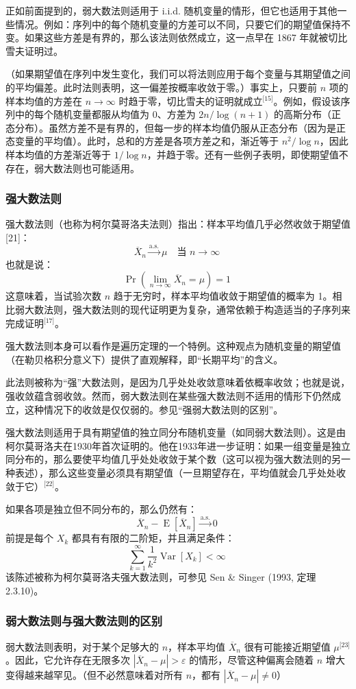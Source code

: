 正如前面提到的，弱大数法则适用于 i.i.d. 随机变量的情形，但它也适用于其他一些情况。例如：序列中的每个随机变量的方差可以不同，只要它们的期望值保持不变。如果这些方差是有界的，那么该法则依然成立，这一点早在 1867 年就被切比雪夫证明过。

（如果期望值在序列中发生变化，我们可以将法则应用于每个变量与其期望值之间的平均偏差。此时法则表明，这一偏差按概率收敛于零。）事实上，只要前 $n$ 项的样本均值的方差在 $n \to \infty$ 时趋于零，切比雪夫的证明就成立\(^\text{[15]}\)。例如，假设该序列中的每个随机变量都服从均值为 0、方差为 $2n/\log(n+1)$ 的高斯分布（正态分布）。虽然方差不是有界的，但每一步的样本均值仍服从正态分布（因为是正态变量的平均值）。此时，总和的方差是各项方差之和，渐近等于 $n^2 / \log n$，因此样本均值的方差渐近等于 $1 / \log n$，并趋于零。还有一些例子表明，即使期望值不存在，弱大数法则也可能适用。
\subsubsection{强大数法则}
强大数法则（也称为柯尔莫哥洛夫法则）指出：样本平均值几乎必然收敛于期望值[21]：
$$
\overline{X}_n \xrightarrow{\text{a.s.}} \mu \quad \text{当 } n \to \infty~
$$
也就是说：
$$
\Pr\left(\lim_{n \to \infty} \overline{X}_n = \mu\right) = 1~
$$
这意味着，当试验次数 $n$ 趋于无穷时，样本平均值收敛于期望值的概率为 1。相比弱大数法则，强大数法则的现代证明更为复杂，通常依赖于构造适当的子序列来完成证明\(^\text{[17]}\)。

强大数法则本身可以看作是遍历定理的一个特例。这种观点为随机变量的期望值（在勒贝格积分意义下）提供了直观解释，即“长期平均”的含义。

此法则被称为“强”大数法则，是因为几乎处处收敛意味着依概率收敛；也就是说，强收敛蕴含弱收敛。然而，弱大数法则在某些强大数法则不适用的情形下仍然成立，这种情况下的收敛是仅仅弱的。参见“强弱大数法则的区别”。

强大数法则适用于具有期望值的独立同分布随机变量（如同弱大数法则）。这是由柯尔莫哥洛夫在1930年首次证明的。他在1933年进一步证明：如果一组变量是独立同分布的，那么要使平均值几乎处处收敛于某个数（这可以视为强大数法则的另一种表述），那么这些变量必须具有期望值（一旦期望存在，平均值就会几乎处处收敛于它）\(^\text{[22]}\)。

如果各项是独立但不同分布的，那么仍然有：
$$
\overline{X}_n - \operatorname{E}[\overline{X}_n] \xrightarrow{\text{a.s.}} 0~
$$
前提是每个 $X_k$ 都具有有限的二阶矩，并且满足条件：
$$
\sum_{k=1}^{\infty} \frac{1}{k^2} \operatorname{Var}[X_k] < \infty~
$$
该陈述被称为柯尔莫哥洛夫强大数法则，可参见 Sen & Singer (1993, 定理 2.3.10)。
\subsubsection{弱大数法则与强大数法则的区别}
弱大数法则表明，对于某个足够大的 $n$，样本平均值 $\overline{X}_n$ 很有可能接近期望值 $\mu$\(^\text{[23]}\)。因此，它允许存在无限多次 $|\overline{X}_n - \mu| > \varepsilon$ 的情形，尽管这种偏离会随着 $n$ 增大变得越来越罕见。（但不必然意味着对所有 $n$，都有 $|\overline{X}_n - \mu| \ne 0$）

